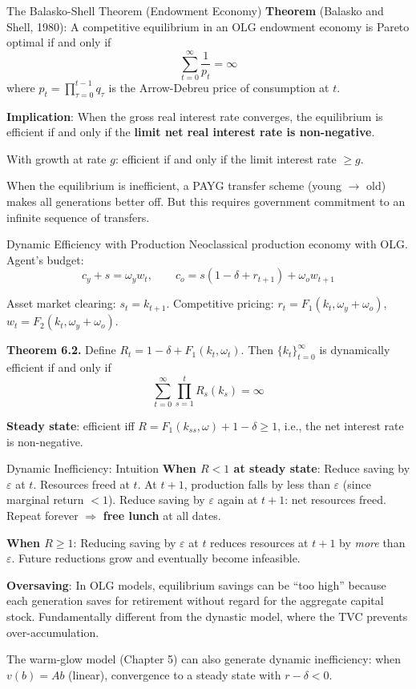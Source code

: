 \documentclass[blue]{beamer}
\begin{document}
\begin{frame}{The Balasko-Shell Theorem (Endowment Economy)}
	\textbf{Theorem} (Balasko and Shell, 1980): A competitive equilibrium in an OLG endowment economy is Pareto optimal if and only if
	\[
	\sum_{t=0}^{\infty} \frac{1}{p_t} = \infty
	\]
	where $p_t = \prod_{\tau=0}^{t-1} q_\tau$ is the Arrow-Debreu price of consumption at $t$.
	

	\textbf{Implication}: When the gross real interest rate converges, the equilibrium is efficient if and only if the \textbf{limit net real interest rate is non-negative}.
	

	With growth at rate $g$: efficient if and only if the limit interest rate $\geq g$.
	

	When the equilibrium is inefficient, a PAYG transfer scheme (young $\to$ old) makes all generations better off. But this requires government commitment to an infinite sequence of transfers.
\end{frame}

\begin{frame}{Dynamic Efficiency with Production}
	Neoclassical production economy with OLG. Agent's budget:
	\[
	c_y + s = \omega_y w_t, \qquad c_o = s(1-\delta+r_{t+1}) + \omega_o w_{t+1}
	\]
	
	Asset market clearing: $s_t = k_{t+1}$. Competitive pricing: $r_t = F_1(k_t, \omega_y + \omega_o)$, $w_t = F_2(k_t, \omega_y + \omega_o)$.
	
	\bigskip
	\textbf{Theorem 6.2.} Define $R_t = 1-\delta+F_1(k_t, \omega_t)$. Then $\{k_t\}_{t=0}^{\infty}$ is dynamically efficient if and only if
	\[
	\sum_{t=0}^{\infty} \prod_{s=1}^{t} R_s(k_s) = \infty
	\]
	
	\textbf{Steady state}: efficient iff $R = F_1(k_{ss}, \omega) + 1 - \delta \geq 1$, i.e., the net interest rate is non-negative.
\end{frame}

\begin{frame}{Dynamic Inefficiency: Intuition}
	\textbf{When $R < 1$ at steady state}: Reduce saving by $\varepsilon$ at $t$. Resources freed at $t$. At $t+1$, production falls by less than $\varepsilon$ (since marginal return $< 1$). Reduce saving by $\varepsilon$ again at $t+1$: net resources freed. Repeat forever $\Rightarrow$ \textbf{free lunch} at all dates.
	

	\textbf{When $R \geq 1$}: Reducing saving by $\varepsilon$ at $t$ reduces resources at $t+1$ by \emph{more} than $\varepsilon$. Future reductions grow and eventually become infeasible.
	

	\textbf{Oversaving}: In OLG models, equilibrium savings can be ``too high'' because each generation saves for retirement without regard for the aggregate capital stock. Fundamentally different from the dynastic model, where the TVC prevents over-accumulation.
	

	The warm-glow model (Chapter 5) can also generate dynamic inefficiency: when $v(b) = Ab$ (linear), convergence to a steady state with $r - \delta < 0$.
\end{frame}
\end{document}
